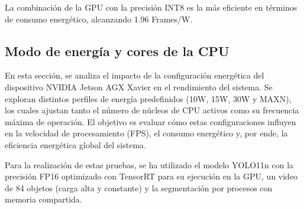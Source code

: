 \documentclass[11pt,spanish,listoffigures,listoftables]{tfgetsinf}
\begin{document}
   La combinación de la GPU con la precisión INT8 es la más eficiente en términos de consumo energético, alcanzando 1.96 Frames/W.






   
   \subsection{Modo de energía y cores de la CPU} \label{sub:modo_energia}
   En esta sección, se analiza el impacto de la configuración energética del dispositivo NVIDIA Jetson AGX Xavier en el rendimiento del sistema. Se exploran distintos perfiles de energía predefinidos (10W, 15W, 30W y MAXN), los cuales ajustan tanto el número de núcleos de CPU activos como su frecuencia máxima de operación. El objetivo es evaluar cómo estas configuraciones influyen en la velocidad de procesamiento (FPS), el consumo energético y, por ende, la eficiencia energética global del sistema.

   Para la realización de estas pruebas, se ha utilizado el modelo YOLO11n con la precisión FP16 optimizado con TensorRT para su ejecución en la GPU, un video de 84 objetos (carga alta y constante) y la segmentación por procesos con memoria compartida.
\end{document}
